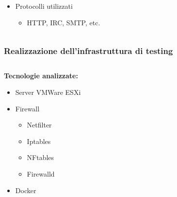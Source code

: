 \begin{frame}
\begin{columns}[t]
\begin{column}{0.5\textwidth}
\begin{itemize}
                \item Protocolli utilizzati
                      \begin{itemize}
                          \item HTTP, IRC, SMTP, etc.
                      \end{itemize}

            \end{itemize}
        \end{column}
    \end{columns}

\end{frame}

\begin{frame}
    \frametitle{Realizzazione dell'infrastruttura di testing}
    \begin{columns}
        \begin{column}{0.4\textwidth}
            \textbf{Tecnologie analizzate:}
            \begin{itemize}
                \item Server VMWare ESXi
                \item Firewall
                      \begin{itemize}
                          \item Netfilter
                          \item Iptables
                          \item NFtables
                          \item Firewalld
                      \end{itemize}
                \item Docker
            \end{itemize}
        \end{column}
        \begin{column}{0.6\textwidth}
            \begin{figure}
                \centering

\end{figure}
\end{column}
\end{columns}
\end{frame}
